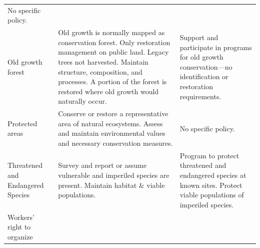 \documentclass[
      12pt,
        ]{article}
\begin{document}
\begin{longtable}[]{@{}lll@{}}
\begin{minipage}[t]{0.36\columnwidth}
No specific policy.\strut
\end{minipage}\tabularnewline
\begin{minipage}[t]{0.20\columnwidth}\raggedright\strut
Old growth forest\strut
\end{minipage} & \begin{minipage}[t]{0.36\columnwidth}\raggedright\strut
Old growth is normally mapped as conservation forest. Only restoration
management on public land. Legacy trees not harvested. Maintain
structure, composition, and processes. A portion of the forest is
restored where old growth would naturally occur.\strut
\end{minipage} & \begin{minipage}[t]{0.36\columnwidth}\raggedright\strut
Support and participate in programs for old growth conservation---no
identification or restoration requirements.\strut
\end{minipage}\tabularnewline
\begin{minipage}[t]{0.20\columnwidth}\raggedright\strut
Protected areas\strut
\end{minipage} & \begin{minipage}[t]{0.36\columnwidth}\raggedright\strut
Conserve or restore a representative area of natural ecosystems. Assess
and maintain environmental values and necessary conservation
measures.\strut
\end{minipage} & \begin{minipage}[t]{0.36\columnwidth}\raggedright\strut
No specific policy.\strut
\end{minipage}\tabularnewline
\begin{minipage}[t]{0.20\columnwidth}\raggedright\strut
Threatened and Endangered Species\strut
\end{minipage} & \begin{minipage}[t]{0.36\columnwidth}\raggedright\strut
Survey and report or assume vulnerable and imperiled species are
present. Maintain habitat \& viable populations.\strut
\end{minipage} & \begin{minipage}[t]{0.36\columnwidth}\raggedright\strut
Program to protect threatened and endangered species at known sites.
Protect viable populations of imperiled species.\strut
\end{minipage}\tabularnewline
\begin{minipage}[t]{0.20\columnwidth}\raggedright\strut
Workers' right to organize\strut
\end{minipage} & \begin{minipage}[t]{0.36\columnwidth}\raggedright\strut

\end{minipage}
\end{longtable}
\end{document}
